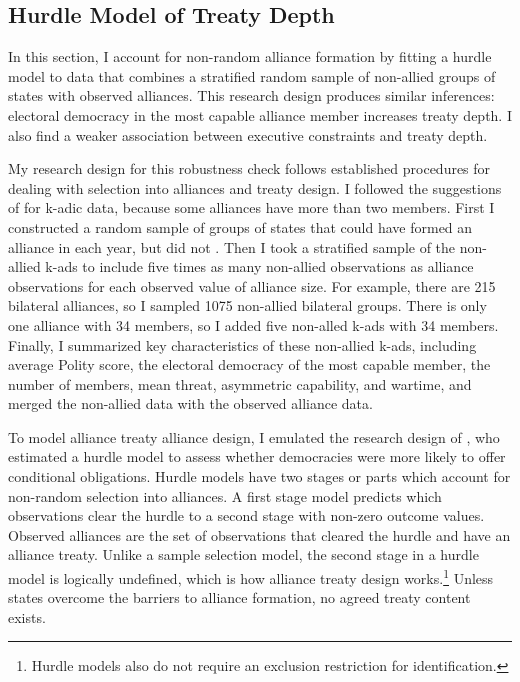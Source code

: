 \documentclass[12pt]{article}
\begin{document}
\subsection{Hurdle Model of Treaty Depth} 


In this section, I account for non-random alliance formation by fitting a hurdle model to data that combines a stratified random sample of non-allied groups of states with observed alliances. 
This research design produces similar inferences: electoral democracy in the most capable alliance member increases treaty depth. 
I also find a weaker association between executive constraints and treaty depth. 


My research design for this robustness check follows established procedures for dealing with selection into alliances and treaty design. 
I followed the suggestions of \citet{Poast2010} for k-adic data, because some alliances have more than two members. 
First I constructed a random sample of groups of states that could have formed an alliance in each year, but did not \citep{FordhamPoast2014}.
Then I took a stratified sample of the non-allied k-ads to include five times as many non-allied observations as alliance observations for each observed value of alliance size. 
For example, there are 215 bilateral alliances, so I sampled 1075 non-allied bilateral groups. 
There is only one alliance with 34 members, so I added five non-alled k-ads with 34 members. 
Finally, I summarized key characteristics of these non-allied k-ads, including average Polity score, the electoral democracy of the most capable member, the number of members, mean threat, asymmetric capability, and wartime, and merged the non-allied data with the observed alliance data. 


To model alliance treaty alliance design, I emulated the research design of \citet{Chibaetal2015}, who estimated a hurdle model to assess whether democracies were more likely to offer conditional obligations.
Hurdle models have two stages or parts which account for non-random selection into alliances.
A first stage model predicts which observations clear the hurdle to a second stage with non-zero outcome values. 
Observed alliances are the set of observations that cleared the hurdle and have an alliance treaty. 
Unlike a sample selection model, the second stage in a hurdle model is logically undefined, which is how alliance treaty design works.\footnote{Hurdle models also do not require an exclusion restriction for identification.} 
Unless states overcome the barriers to alliance formation, no agreed treaty content exists. 
\end{document}
